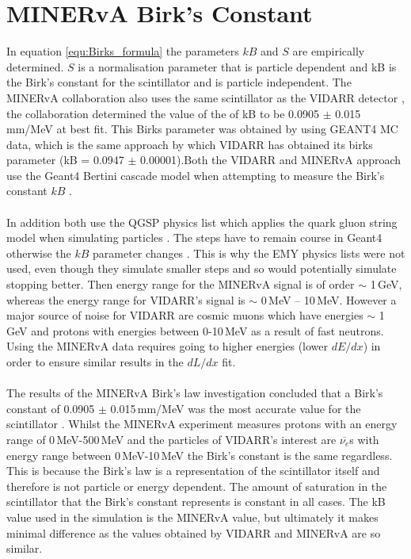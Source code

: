 \section{MINERvA Birk's Constant}\label{sec:geant4Simulation_MINERvABirksConstant}
In equation \ref{equ:Birks_formula} the parameters $kB$ and $S$ are empirically determined. $S$ is a normalisation parameter that is particle dependent and kB is the Birk's constant for the scintillator and is particle independent. The MINERvA collaboration \cite{aliaga_2015} also uses the same scintillator as the VIDARR detector \cite{aliaga_2014}, the collaboration determined the value of the of kB to be 0.0905 $\pm$ 0.015\,mm/MeV at best fit. This Birks parameter was obtained by using GEANT4 MC data, which is the same approach by which VIDARR has obtained its birks parameter (kB = 0.0947 $\pm$ 0.00001).Both the VIDARR and MINERvA approach use the Geant4 Bertini cascade model when attempting to measure the Birk's constant $kB$ \cite{Heikkinen_2003}. 
\\\\In addition both use the QGSP physics list which applies the quark gluon string model when simulating particles \cite{Patrick_2018}. The steps have to remain course in Geant4 otherwise the $kB$ parameter changes  \cite{aliaga_2015}. This is why the EMY physics lists were not used, even though they simulate smaller steps and so would potentially simulate stopping better. Then energy range for the MINERvA signal is of order $\sim$ 1\,GeV, whereas the energy range for VIDARR's signal is $\sim$ 0\,MeV -- 10\,MeV. However a major source of noise for VIDARR are cosmic muons which have energies $\sim$ 1\,GeV and protons with energies between 0-10\,MeV as a result of fast neutrons. Using the MINERvA data requires going to higher energies (lower $dE/dx$) in order to ensure similar results in the $dL/dx$ fit.  
\\\\The results of the MINERvA Birk's law investigation concluded that a Birk's constant of 0.0905 $\pm$ 0.015\,mm/MeV was the most accurate value for the scintillator \cite{aliaga_2015}. Whilst the MINERvA experiment measures protons with an energy range of 0\,MeV-500\,MeV and the particles of VIDARR's interest are $\overline{\nu_{e}}$s with energy range between 0\,MeV-10\,MeV the Birk's constant is the same regardless. This is because the Birk's law is a representation of the scintillator itself and therefore is not particle or energy dependent. The amount of saturation in the scintillator that the Birk's constant represents is constant in all cases. The kB value used in the simulation is the MINERvA value, but ultimately it makes minimal difference as the values obtained by VIDARR and MINERvA are so similar. 
